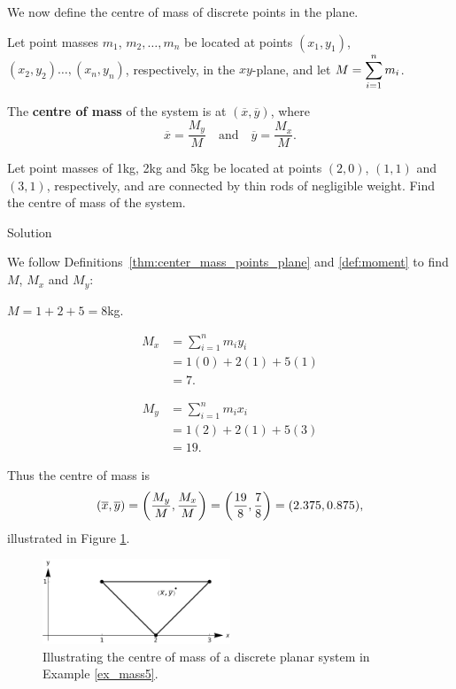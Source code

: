 We now define the centre of mass of discrete points in the plane.

\begin{definition}\label{thm:center_mass_points_plane}
Let point masses $m_1$, $m_2,\ldots,m_n$ be located at points $(x_1,y_1)$, $(x_2,y_2)\ldots,(x_n,y_n)$, respectively, in the $xy$-plane, and let $\displaystyle M = \sum_{i=1}^n m_i$.  

The \textbf{centre of mass} of the system is at $(\overline{x},\overline{y})$, where 
$$\overline{x}= \frac{M_y}{M}\quad \text{and}\quad \overline{y} = \frac{M_x}{M}.$$

\end{definition}

\begin{example}\label{ex_mass5}
Let point masses of 1kg, 2kg and 5kg be located at points $(2,0)$, $(1,1)$ and $(3,1)$, respectively, and are connected by thin rods of negligible weight. Find the centre of mass of the system.

Solution 


We follow Definitions~\ref{thm:center_mass_points_plane} and \ref{def:moment} to find $M$, $M_x$ and $M_y$:

$M = 1+2+5 = 8$kg.

\noindent\begin{minipage}{.5\linewidth}
\begin{align*}
M_x &=  \sum_{i=1}^n m_iy_i \\
		&= 1(0) + 2(1) + 5(1) \\
		&= 7.
\end{align*}
\end{minipage}
\begin{minipage}{.5\linewidth}
\begin{align*}
M_y &=  \sum_{i=1}^n m_ix_i \\
		&= 1(2) + 2(1) + 5(3) \\
		&= 19.
\end{align*}
\end{minipage}

Thus the centre of mass is $$\displaystyle (\overline{x},\overline{y}) = \left(\frac{M_y}{M},\frac{M_x}M\right) = \left(\frac{{19}}8,\frac78\right)  =(2.375,0.875),$$ illustrated in Figure \ref{fig_multiple_19}.

\begin{figure}[H]
	\begin{center}
			\includegraphics[width=0.5\textwidth]{fig_multiple_19}
	\caption{Illustrating the centre of mass of a discrete planar system in Example \ref{ex_mass5}.}
	\label{fig_multiple_19}
	\end{center}
\end{figure}

\end{example}

